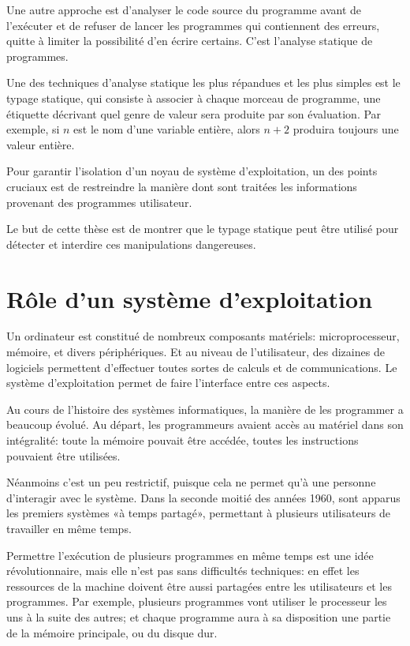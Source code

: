 Une autre approche est d'analyser le code source du programme avant de
l'exécuter et de refuser de lancer les programmes qui contiennent des erreurs,
quitte à limiter la possibilité d'en écrire certains. C'est l'analyse statique
de programmes.

Une des techniques d'analyse statique les plus répandues et les plus simples est
le typage statique, qui consiste à associer à chaque morceau de programme, une
étiquette décrivant quel genre de valeur sera produite par son évaluation. Par
exemple, si $n$ est le nom d'une variable entière, alors $n + 2$ produira
toujours une valeur entière.

Pour garantir l'isolation d'un noyau de système d'exploitation, un des points
cruciaux est de restreindre la manière dont sont traitées les informations
provenant des programmes utilisateur.

Le but de cette thèse est de montrer que le typage statique peut être utilisé
pour détecter et interdire ces manipulations dangereuses.

\section{Rôle d'un système d'exploitation}

Un ordinateur est constitué de nombreux composants matériels: microprocesseur,
mémoire, et divers périphériques. Et au niveau de l'utilisateur, des dizaines de
logiciels permettent d'effectuer toutes sortes de calculs et de communications.
Le système d'exploitation permet de faire l'interface entre ces aspects.

Au cours de l'histoire des systèmes informatiques, la manière de les programmer
a beaucoup évolué. Au départ, les programmeurs avaient accès au matériel dans
son intégralité: toute la mémoire pouvait être accédée, toutes les instructions
pouvaient être utilisées.

Néanmoins c'est un peu restrictif, puisque cela ne permet qu'à une personne
d'interagir avec le système. Dans la seconde moitié des années 1960, sont
apparus les premiers systèmes «à temps partagé», permettant à plusieurs
utilisateurs de travailler en même temps.

Permettre l'exécution de plusieurs programmes en même temps est une idée
révolutionnaire, mais elle n'est pas sans difficultés techniques: en effet les
ressources de la machine doivent être aussi partagées entre les utilisateurs et
les programmes. Par exemple, plusieurs programmes vont utiliser le processeur
les uns à la suite des autres; et chaque programme aura à sa disposition une
partie de la mémoire principale, ou du disque dur.

